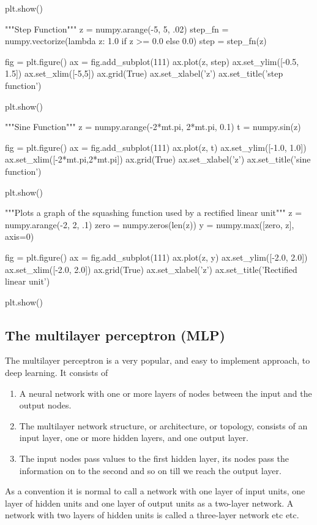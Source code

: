 \documentclass[%
oneside,                 %
final,                   %
10pt]{article}
\begin{document}
plt.show()

"""Step Function"""
z = numpy.arange(-5, 5, .02)
step_fn = numpy.vectorize(lambda z: 1.0 if z >= 0.0 else 0.0)
step = step_fn(z)

fig = plt.figure()
ax = fig.add_subplot(111)
ax.plot(z, step)
ax.set_ylim([-0.5, 1.5])
ax.set_xlim([-5,5])
ax.grid(True)
ax.set_xlabel('z')
ax.set_title('step function')

plt.show()

"""Sine Function"""
z = numpy.arange(-2*mt.pi, 2*mt.pi, 0.1)
t = numpy.sin(z)

fig = plt.figure()
ax = fig.add_subplot(111)
ax.plot(z, t)
ax.set_ylim([-1.0, 1.0])
ax.set_xlim([-2*mt.pi,2*mt.pi])
ax.grid(True)
ax.set_xlabel('z')
ax.set_title('sine function')

plt.show()

"""Plots a graph of the squashing function used by a rectified linear
unit"""
z = numpy.arange(-2, 2, .1)
zero = numpy.zeros(len(z))
y = numpy.max([zero, z], axis=0)

fig = plt.figure()
ax = fig.add_subplot(111)
ax.plot(z, y)
ax.set_ylim([-2.0, 2.0])
ax.set_xlim([-2.0, 2.0])
ax.grid(True)
ax.set_xlabel('z')
ax.set_title('Rectified linear unit')

plt.show()
\epycod


\subsection{The multilayer  perceptron (MLP)}

The multilayer perceptron is a very popular, and easy to implement approach, to deep learning. It consists of
\begin{enumerate}
\item A neural network with one or more layers of nodes between the input and the output nodes.

\item The multilayer network structure, or architecture, or topology, consists of an input layer, one or more hidden layers, and one output layer.

\item The input nodes pass values to the first hidden layer, its nodes pass the information on to the second and so on till we reach the output layer.
\end{enumerate}

\noindent
As a convention it is normal to call  a  network with one layer of input units, one layer of hidden
units and one layer of output units as  a two-layer network. A network with two layers of hidden units is called a three-layer network etc etc.
\end{document}
